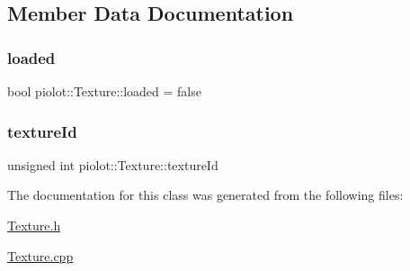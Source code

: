 \subsection{Member Data Documentation}
\mbox{\label{classpiolot_1_1_texture_ae5c1576fdea6556a4d5a0faa0a52a9a8}} 
\subsubsection{\texorpdfstring{loaded}{loaded}}
{\footnotesize\ttfamily bool piolot\+::\+Texture\+::loaded = false\hspace{0.3cm}{\ttfamily [protected]}}

\mbox{\label{classpiolot_1_1_texture_a11b86ffd9963a4f9a98e3d70edc14322}} 
\subsubsection{\texorpdfstring{texture\+Id}{textureId}}
{\footnotesize\ttfamily unsigned int piolot\+::\+Texture\+::texture\+Id\hspace{0.3cm}{\ttfamily [protected]}}



The documentation for this class was generated from the following files\+:\begin{DoxyCompactItemize}
\item 
\mbox{\hyperlink{_texture_8h}{Texture.\+h}}\item 
\mbox{\hyperlink{_texture_8cpp}{Texture.\+cpp}}\end{DoxyCompactItemize}

